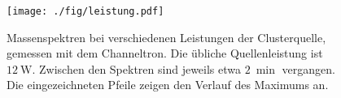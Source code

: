 \begin{figure}
  \centering
  \texttt{[image: ./fig/leistung.pdf]}
  \caption{Massenspektren bei verschiedenen Leistungen der Clusterquelle, gemessen mit dem Channeltron. Die übliche Quellenleistung ist $\SI{12}{\watt}$. Zwischen den Spektren sind jeweils etwa $\SI{2}{\min}$ vergangen. Die eingezeichneten Pfeile zeigen den Verlauf des Maximums an.}
  \label{fig:leistung}
\end{figure}
